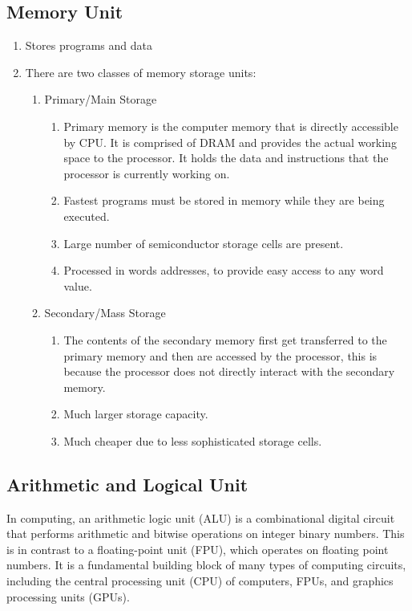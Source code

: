 \documentclass[british]{extreport}
\begin{document}
\subsection{Memory Unit}
\begin{enumerate}
	\item Stores programs and data
	\item There are two classes of memory storage units:
	      \begin{enumerate}
		      \item Primary/Main Storage
		            \begin{enumerate}
			            \item Primary memory is the computer memory that is directly accessible
			                  by CPU. It is comprised of DRAM and provides the actual working space
			                  to the processor. It holds the data and instructions that the processor
			                  is currently working on.
			            \item Fastest programs must be stored in memory while they are being executed.
			            \item Large number of semiconductor storage cells are present.
			            \item Processed in words addresses, to provide easy access to any word value.
		            \end{enumerate}
		      \item Secondary/Mass Storage
		            \begin{enumerate}
			            \item The contents of the secondary memory first get transferred to the
			                  primary memory and then are accessed by the processor, this is because
			                  the processor does not directly interact with the secondary memory.
			            \item Much larger storage capacity.
			            \item Much cheaper due to less sophisticated storage cells.
		            \end{enumerate}
	      \end{enumerate}
\end{enumerate}

\subsection{Arithmetic and Logical Unit}

\noindent In computing, an arithmetic logic unit (ALU) is a combinational
digital circuit that performs arithmetic and bitwise operations on
integer binary numbers. This is in contrast to a floating-point unit
(FPU), which operates on floating point numbers. It is a fundamental
building block of many types of computing circuits, including the
central processing unit (CPU) of computers, FPUs, and graphics processing
units (GPUs).
\end{document}
